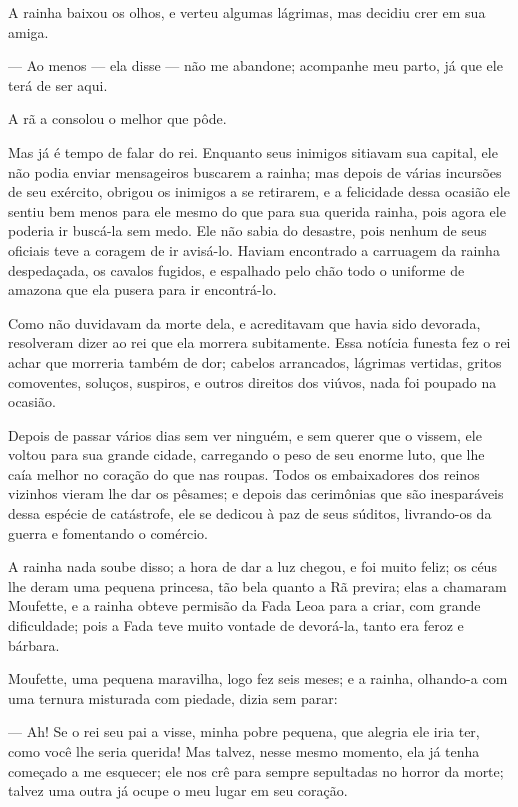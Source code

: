 A rainha baixou os olhos, e verteu algumas lágrimas, mas decidiu crer
em sua amiga.

— Ao menos — ela disse — não me abandone; acompanhe meu parto, já que
ele terá de ser aqui.

A rã a consolou o melhor que pôde.

Mas já é tempo de falar do rei. Enquanto seus inimigos sitiavam sua
capital, ele não podia enviar mensageiros buscarem a rainha; mas
depois de várias incursões de seu exército, obrigou os inimigos a se
retirarem, e a felicidade dessa ocasião ele sentiu bem menos para ele
mesmo do que para sua querida rainha, pois agora ele poderia ir
buscá-la sem medo. Ele não sabia do desastre, pois nenhum de seus
oficiais teve a coragem de ir avisá-lo. Haviam encontrado a carruagem
da rainha despedaçada, os cavalos fugidos, e espalhado pelo chão todo
o uniforme de amazona que ela pusera para ir encontrá-lo.

Como não duvidavam da morte dela, e acreditavam que havia sido
devorada, resolveram dizer ao rei que ela morrera subitamente. Essa
notícia funesta fez o rei achar que morreria também de dor; cabelos
arrancados, lágrimas vertidas, gritos comoventes, soluços, suspiros,
e outros direitos dos viúvos, nada foi poupado na ocasião.

Depois de passar vários dias sem ver ninguém, e sem querer que o
vissem, ele voltou para sua grande cidade, carregando o peso de seu
enorme luto, que lhe caía melhor no coração do que nas roupas. Todos
os embaixadores dos reinos vizinhos vieram lhe dar os pêsames; e
depois das cerimônias que são inesparáveis dessa espécie de
catástrofe, ele se dedicou à paz de seus súditos, livrando-os da
guerra e fomentando o comércio. 

A rainha nada soube disso; a hora de dar a luz chegou, e foi muito
feliz; os céus lhe deram uma pequena princesa, tão bela quanto a Rã
previra; elas a chamaram Moufette, e a rainha obteve permisão da Fada
Leoa para a criar, com grande dificuldade; pois a Fada teve muito
vontade de devorá-la, tanto era feroz e bárbara.

Moufette, uma pequena maravilha, logo fez seis meses; e a rainha,
olhando-a com uma ternura misturada com piedade, dizia sem parar:

— Ah! Se o rei seu pai a visse, minha pobre pequena, que alegria ele
iria ter, como você lhe seria querida! Mas talvez, nesse mesmo
momento, ela já tenha começado a me esquecer; ele nos crê para sempre
sepultadas no horror da morte; talvez uma outra já ocupe o meu lugar
em seu coração.

